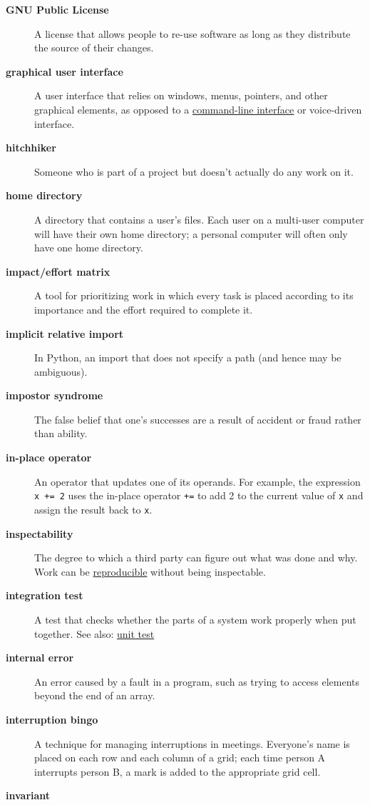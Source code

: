 \documentclass[
]{krantz}
\begin{document}
\begin{description}
\item[\textbf{GNU Public License}]
A license that allows people to re-use software as long as they distribute the source of their changes.
\item[\textbf{graphical user interface}]
A user interface that relies on windows, menus, pointers, and other graphical elements, as opposed to a \protect\hyperlink{cli}{command-line interface} or voice-driven interface.
\item[\textbf{hitchhiker}]
Someone who is part of a project but doesn't actually do any work on it.
\item[\textbf{home directory}]
A directory that contains a user's files. Each user on a multi-user computer will have their own home directory; a personal computer will often only have one home directory.
\item[\textbf{impact/effort matrix}]
A tool for prioritizing work in which every task is placed according to its importance and the effort required to complete it.
\item[\textbf{implicit relative import}]
In Python, an import that does not specify a path (and hence may be ambiguous).
\item[\textbf{impostor syndrome}]
The false belief that one's successes are a result of accident or fraud rather than ability.
\item[\textbf{in-place operator}]
An operator that updates one of its operands. For example, the expression \texttt{x\ +=\ 2} uses the in-place operator \texttt{+=} to add 2 to the current value of \texttt{x} and assign the result back to \texttt{x}.
\item[\textbf{inspectability}]
The degree to which a third party can figure out what was done and why. Work can be \protect\hyperlink{reproducibility}{reproducible} without being inspectable.
\item[\textbf{integration test}]
A test that checks whether the parts of a system work properly when put together. See also: \protect\hyperlink{unit_test}{unit test}
\item[\textbf{internal error}]
An error caused by a fault in a program, such as trying to access elements beyond the end of an array.
\item[\textbf{interruption bingo}]
A technique for managing interruptions in meetings. Everyone's name is placed on each row and each column of a grid; each time person A interrupts person B, a mark is added to the appropriate grid cell.
\item[\textbf{invariant}]

\end{description}
\end{document}
